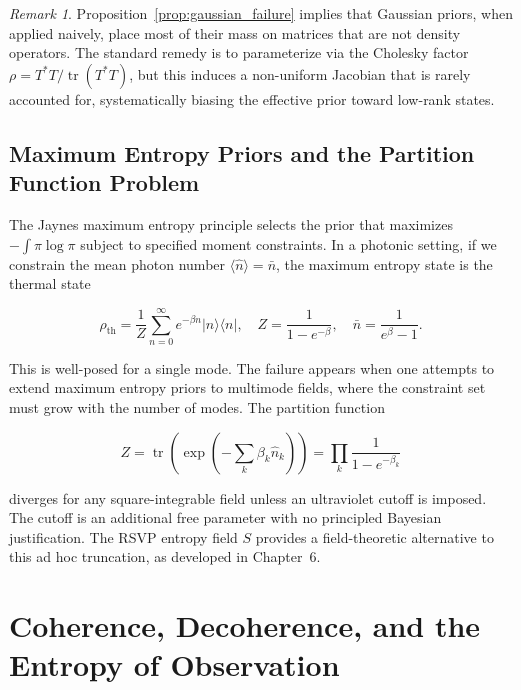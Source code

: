 \documentclass[11pt, openright, twoside]{book}
\theoremstyle{plain}
\theoremstyle{definition}
\theoremstyle{remark}
\newtheorem{remark}[theorem]{Remark}
\newcommand{\Sfield}{S}
\begin{document}
\begin{remark}
Proposition~\ref{prop:gaussian_failure} implies that Gaussian priors, when applied naively,
place most of their mass on matrices that are not density operators. The standard remedy is
to parameterize via the Cholesky factor $\rho = T^*T / \operatorname{tr}(T^*T)$, but this
induces a non-uniform Jacobian that is rarely accounted for, systematically biasing the
effective prior toward low-rank states.
\end{remark}

\section{Maximum Entropy Priors and the Partition Function Problem}

The Jaynes maximum entropy principle selects the prior that maximizes $-\int \pi\log\pi$
subject to specified moment constraints. In a photonic setting, if we constrain the mean
photon number $\langle\hat{n}\rangle = \bar{n}$, the maximum entropy state is the thermal
state

\begin{equation}
  \rho_{\text{th}} = \frac{1}{Z}\sum_{n=0}^\infty e^{-\beta n}|n\rangle\langle n|,
  \quad Z = \frac{1}{1-e^{-\beta}}, \quad \bar{n} = \frac{1}{e^\beta - 1}.
  \label{eq:thermal}
\end{equation}

This is well-posed for a single mode. The failure appears when one attempts to extend
maximum entropy priors to multimode fields, where the constraint set must grow with the
number of modes. The partition function

\begin{equation}
  Z = \operatorname{tr}\!\left(\exp\!\left(-\sum_k \beta_k \hat{n}_k\right)\right)
  = \prod_k \frac{1}{1-e^{-\beta_k}}
  \label{eq:multimode_Z}
\end{equation}

diverges for any square-integrable field unless an ultraviolet cutoff is imposed. The cutoff
is an additional free parameter with no principled Bayesian justification. The RSVP entropy
field $\Sfield$ provides a field-theoretic alternative to this ad hoc truncation, as
developed in Chapter~6.

\chapter{Coherence, Decoherence, and the Entropy of Observation}
\end{document}
